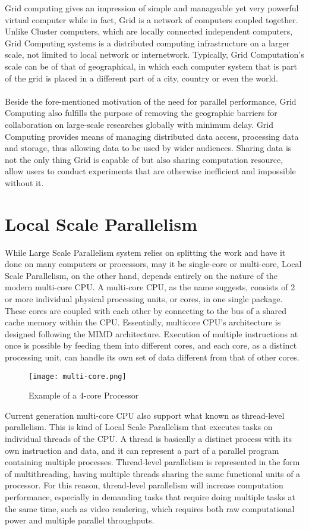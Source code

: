 Grid computing gives an impression of simple and manageable yet very powerful virtual computer while in fact, Grid is a network of computers coupled together. Unlike Cluster computers, which are locally connected independent computers, Grid Computing systems is a distributed computing infrastructure on a larger scale, not limited to local network or internetwork. Typically, Grid Computation's scale can be of that of geographical, in which each computer system that is part of the grid is placed in a different part of a city, country or even the world. \\
~\\
Beside the fore-mentioned motivation of the need for parallel performance, Grid Computing also fulfills the purpose of removing the geographic barriers for collaboration on large-scale researches globally with minimum delay. Grid Computing provides means of managing distributed data access, processing data and storage, thus allowing data to be used by wider audiences. Sharing data is not the only thing Grid is capable of but also sharing computation resource, allow users to conduct experiments that are otherwise inefficient and impossible without it. \\


\section{Local Scale Parallelism}

While Large Scale Parallelism system relies on splitting the work and have it done on many computers or processors, may it be single-core or multi-core, Local Scale Parallelism, on the other hand, depends entirely on the nature of the modern multi-core CPU. A multi-core CPU, as the name suggests, consists of 2 or more individual physical processing units, or cores, in one single package. These cores are coupled with each other by connecting to the bus of a shared cache memory within the CPU. Essentially, multicore CPU's architecture is designed following the MIMD architecture. Execution of multiple instructions at once is possible by feeding them into different cores, and each core, as a distinct processing unit, can handle its own set of data different from that of other cores. \\
\begin{figure}[H]
\texttt{[image: multi-core.png]}
\centering
\caption{Example of a 4-core Processor}
\end{figure}
Current generation multi-core CPU also support what known as thread-level parallelism. This is kind of Local Scale Parallelism that executes tasks on individual threads of the CPU. A thread is basically a distinct process with its own instruction and data, and it can represent a part of a parallel program containing multiple processes. Thread-level parallelism is represented in the form of multithreading, having multiple threads sharing the same functional units of a processor. For this reason, thread-level parallelism will increase computation performance, especially in demanding tasks that require doing multiple tasks at the same time, such as video rendering, which requires both raw computational power and multiple parallel throughputs. \\
